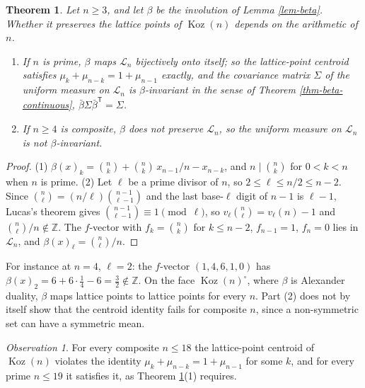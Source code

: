 \documentclass[11pt, a4paper, abstract=yes]{scrartcl}
\theoremstyle{definition}
\theoremstyle{remark}
\theoremstyle{plain}
\newtheorem{theorem}[definition]{Theorem}
\theoremstyle{remark}
\newtheorem{observation}[definition]{Observation}
\theoremstyle{plain}
\newcommand{\Koz}{\operatorname{Koz}}
\newcommand{\leandiscof}[1]{\tikz[baseline=-0.6ex]\fill[#1] (0,0) circle (0.6ex);}
\newcommand{\leanfull}{\leandiscof{leanfull}}
\newcommand{\leanmark}[1]{\leavevmode{\reversemarginpar\marginnote{\raggedleft#1}}}
\begin{document}
\begin{theorem}
\leanmark{\leanfull}Let \(n\ge3\), and let \(\beta\) be the involution of Lemma \ref{lem-beta}. Whether it preserves the
lattice points of \(\Koz(n)\) depends on the arithmetic of \(n\).
\begin{enumerate}
\item If \(n\) is prime, \(\beta\) maps \(\mathcal L_n\) bijectively onto itself; so the lattice-point
centroid satisfies \(\mu_k+\mu_{n-k}=1+\mu_{n-1}\) exactly, and the covariance matrix
\(\Sigma\) of the uniform measure on \(\mathcal L_n\) is \(\beta\)-invariant in the sense of
Theorem \ref{thm-beta-continuous}, \(\bar\beta\Sigma\bar\beta^{\mathsf T}=\Sigma\).
\item If \(n\ge4\) is composite, \(\beta\) does not preserve \(\mathcal L_n\), so the uniform measure on
\(\mathcal L_n\) is not \(\beta\)-invariant.
\end{enumerate}
\label{thm-beta-lattice}
\end{theorem}

\begin{proof}
(1) \(\beta(x)_k=\binom nk+\binom nk\,x_{n-1}/n-x_{n-k}\), and \(n\mid\binom nk\) for \(0<k<n\) when \(n\)
is prime. (2) Let \(\ell\) be a prime divisor of \(n\), so \(2\le\ell\le n/2\le n-2\). Since
\(\binom n\ell=(n/\ell)\binom{n-1}{\ell-1}\) and the last base-\(\ell\) digit of \(n-1\) is \(\ell-1\),
Lucas's theorem gives \(\binom{n-1}{\ell-1}\equiv1\pmod\ell\), so \(v_\ell\binom n\ell=v_\ell(n)-1\) and
\(\binom n\ell/n\notin\mathbb Z\). The \(f\)-vector with \(f_k=\binom nk\) for \(k\le n-2\),
\(f_{n-1}=1\), \(f_n=0\) lies in \(\mathcal L_n\), and \(\beta(x)_\ell=\binom n\ell/n\).
\end{proof}

For instance at \(n=4\), \(\ell=2\): the \(f\)-vector \((1,4,6,1,0)\) has
\(\beta(x)_2=6+6\cdot\tfrac14-6=\tfrac32\notin\mathbb Z\). On the face \(\Koz(n)^\circ\), where \(\beta\) is
Alexander duality, \(\beta\) maps lattice points to lattice points for every \(n\). Part (2) does not by
itself show that the centroid identity fails for composite \(n\), since a non-symmetric set can have a
symmetric mean.

\begin{observation}
For every composite \(n\le18\) the lattice-point centroid of \(\Koz(n)\) violates the identity
\(\mu_k+\mu_{n-k}=1+\mu_{n-1}\) for some \(k\), and for every prime \(n\le19\) it satisfies it, as
Theorem \ref{thm-beta-lattice}(1) requires.
\label{obs-beta-composite}
\end{observation}
\end{document}
